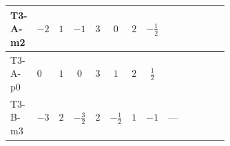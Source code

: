\documentclass[8pt]{article}
\begin{document}
\begin{landscape}
\begin{longtable}{@{}llcccccc >{\raggedright\arraybackslash}p{0.21\linewidth} >{\raggedright\arraybackslash}p{0.21\linewidth} >{\raggedright\arraybackslash}p{0.21\linewidth}@{}}
\midrule
T3-A-m2 & $-2$ & $1$ & $-1$ & $3$ & $0$ & $2$ & $-\frac{1}{2}$ & \scriptsize\adjustbox{max width=\linewidth}{$\begin{gathered} {\lambda_{HS_1}^{(1)}} (4 T_{\nu}^{(1)}+6 \operatorname{Tr}\!\left({Y_d}\,\left({Y_d}\right)^{\dagger}\right)+2 \operatorname{Tr}\!\left({Y_e}\,\left({Y_e}\right)^{\dagger}\right)+6 \operatorname{Tr}\!\left({Y_u}\,\left({Y_u}\right)^{\dagger}\right))\end{gathered}$} & \scriptsize\adjustbox{max width=\linewidth}{$\begin{gathered} -4 \operatorname{Tr}\!\left({y_1}\,\left({y_1}\right)^{\dagger}\,{Y_e}\,\left({Y_e}\right)^{\dagger}\right)\end{gathered}$} & \scriptsize\adjustbox{max width=\linewidth}{$\begin{gathered} +12 {\lambda_5} \left({\lambda_5}\right)^{*}\end{gathered}$} \\
\midrule
T3-A-p0 & $0$ & $1$ & $0$ & $3$ & $1$ & $2$ & $\frac{1}{2}$ & \scriptsize\adjustbox{max width=\linewidth}{$\begin{gathered} {\lambda_{HS_1}^{(1)}} (4 T_{\nu}^{(1)}+6 \operatorname{Tr}\!\left({Y_d}\,\left({Y_d}\right)^{\dagger}\right)+2 \operatorname{Tr}\!\left({Y_e}\,\left({Y_e}\right)^{\dagger}\right)+6 \operatorname{Tr}\!\left({Y_u}\,\left({Y_u}\right)^{\dagger}\right))\end{gathered}$} & \scriptsize\adjustbox{max width=\linewidth}{$\begin{gathered} -4 \operatorname{Tr}\!\left({y_1}\,\left({y_1}\right)^{\dagger}\,{Y_e}\,\left({Y_e}\right)^{\dagger}\right)\end{gathered}$} & \scriptsize\adjustbox{max width=\linewidth}{$\begin{gathered} +12 {\lambda_5} \left({\lambda_5}\right)^{*}\end{gathered}$} \\
\midrule
T3-B-m3 & $-3$ & $2$ & $-\frac{3}{2}$ & $2$ & $-\frac{1}{2}$ & $1$ & $-1$ & --- & \scriptsize\adjustbox{max width=\linewidth}{$\begin{gathered} -2 \operatorname{Tr}\!\left({y_1}\,\left({y_1}\right)^{\dagger}\,{Y_e}\,\left({Y_e}\right)^{\dagger}\right)\end{gathered}$} & \scriptsize\adjustbox{max width=\linewidth}{$\begin{gathered} +6 {\lambda_5} \left({\lambda_5}\right)^{*}\end{gathered}$} \\
\midrule

\end{longtable}
\end{landscape}
\end{document}
